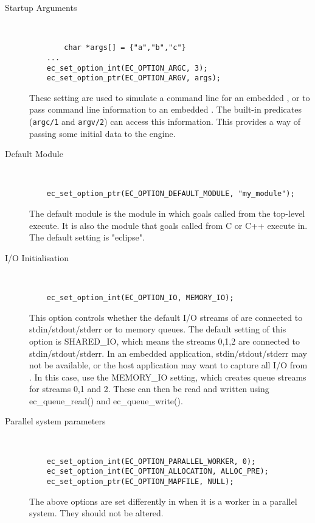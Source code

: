 \begin{description}
\item[Startup Arguments]\ \\
\begin{verbatim}
        char *args[] = {"a","b","c"}
	...
	ec_set_option_int(EC_OPTION_ARGC, 3);
	ec_set_option_ptr(EC_OPTION_ARGV, args);
\end{verbatim}
These setting are used to simulate a command line for an embedded
{\eclipse}, or to pass command line information to an embedded
{\eclipse}.  The {\eclipse} built-in predicates (\verb.argc/1.
and \verb.argv/2.) can access this information.  This provides
a way of passing some initial data to the {\eclipse} engine.


\item[Default Module]\ \\
\begin{verbatim}
	ec_set_option_ptr(EC_OPTION_DEFAULT_MODULE, "my_module");
\end{verbatim}
The default module is the module in which goals called from the
top-level execute. It is also the module that goals called from C
or C++ execute in. The default setting is "eclipse".


\item[I/O Initialisation]\ \\
\begin{verbatim}
	ec_set_option_int(EC_OPTION_IO, MEMORY_IO);
\end{verbatim}
This option controls whether the default I/O streams of {\eclipse} are
connected to stdin/stdout/stderr or to memory queues.
The default setting of this option is SHARED_IO, which means the
{\eclipse} streams 0,1,2 are connected to stdin/stdout/stderr.
In an embedded application, stdin/stdout/stderr may not be available,
or the host application may want to capture all I/O from {\eclipse}.
In this case, use the MEMORY_IO setting, which creates queue streams
for streams 0,1 and 2. These can then be read and written using
ec_queue_read() and ec_queue_write().


\item[Parallel system parameters]\ \\
\begin{verbatim}
	ec_set_option_int(EC_OPTION_PARALLEL_WORKER, 0);
	ec_set_option_int(EC_OPTION_ALLOCATION, ALLOC_PRE);
	ec_set_option_ptr(EC_OPTION_MAPFILE, NULL);
\end{verbatim}
The above options are set differently in {\eclipse} when it is a
worker in a parallel system. They should not be altered.
\end{description}

